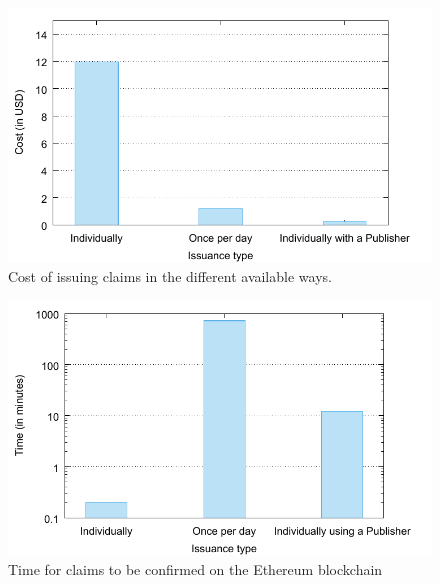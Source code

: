 \begin{figure}[t]
  \centering
  \includegraphics[width=\columnwidth]{final-figures/publisher-issuing-price.pdf}
  \vspace{-10pt}
  \caption{Cost of issuing claims in the different available ways.}
  \label{fig:costpublishers}
\end{figure}

\begin{figure}[t]
  \centering
  \includegraphics[width=\columnwidth]{final-figures/publisher-issuing-time.pdf}
  \vspace{-10pt}
  \caption{Time for claims to be confirmed on the Ethereum blockchain}
  \label{fig:timepublishers}
\end{figure}

